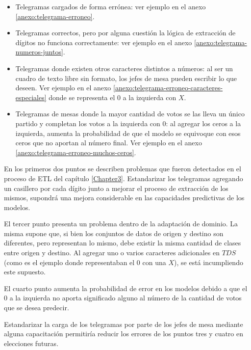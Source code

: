 \begin{itemize}
    \item Telegramas cargados de forma errónea: ver ejemplo en el anexo \ref{anexo:telegrama-erroneo}.
    \item Telegramas correctos, pero por alguna cuestión la lógica de extracción de dígitos no funciona correctamente: ver
          ejemplo en el anexo \ref{anexo:telegrama-numeros-juntos}.
    \item Telegramas donde existen otros caracteres distintos a números: al ser un cuadro de texto libre sin formato, los jefes
          de mesa pueden escribir lo que deseen. Ver ejemplo en el anexo \ref{anexo:telegrama-erroneo-caracteres-especiales}
          donde se representa el $0$ a la izquierda con $X$.
    \item Telegramas de mesas donde la mayor cantidad de votos se las lleva un único partido y completan los votos a la izquierda
          con $0$: al agregar los ceros a la izquierda, aumenta la probabilidad de que el modelo se equivoque con esos ceros que
          no aportan al número final. Ver ejemplo en el anexo \ref{anexo:telegrama-erroneo-muchos-ceros}.
\end{itemize}

En los primeros dos puntos se describen problemas que fueron detectados en el proceso de ETL del capítulo
\ref{Chapter3}. Estandarizar los telegramas agregando un casillero por cada dígito junto a mejorar el proceso de
extracción de los mismos, supondrá una mejora considerable en las capacidades predictivas de los modelos.

El tercer punto presenta un problema dentro de la adaptación de dominio. La misma supone que, si bien los conjuntos de
datos de origen y destino son diferentes, pero representan lo mismo, debe existir la misma cantidad de clases entre
origen y destino. Al agregar uno o varios caracteres adicionales en $TDS$ (como es el ejemplo donde representaban el
$0$ con una $X$), se está incumpliendo este supuesto.

El cuarto punto aumenta la probabilidad de error en los modelos debido a que el $0$ a la izquierda no aporta
significado alguno al número de la cantidad de votos que se desea predecir.

Estandarizar la carga de los telegramas por parte de los jefes de mesa mediante alguna capacitación permitiría reducir
los errores de los puntos tres y cuatro en elecciones futuras.

